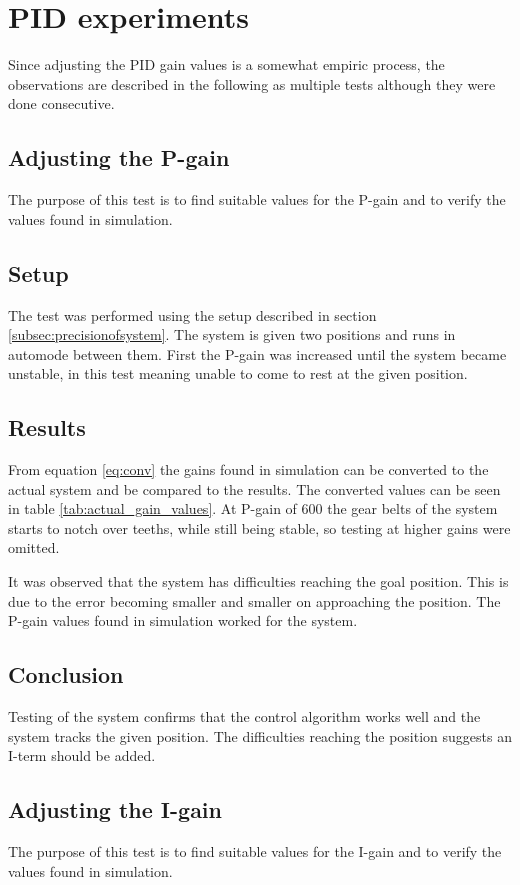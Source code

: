 \section{PID experiments}\label{sec:pid_experiments}
Since adjusting the PID gain values is a somewhat empiric process, the
observations are described in the following as multiple tests although they were
done consecutive.

\subsection{Adjusting the P-gain}\label{sec:pid_experiments_p}
The purpose of this test is to find suitable values for the P-gain and to verify
the values found in simulation.

\subsection*{Setup} The test was performed using the setup described in
section \ref{subsec:precisionofsystem}. The system is given two positions and runs in
automode between them. First the P-gain was increased until the system became
unstable, in this test meaning unable to come to rest at the given position.

\subsection*{Results} From equation \ref{eq:conv} the gains found in simulation can be
converted to the actual system and be compared to the results. The converted
values can be seen in table \ref{tab:actual_gain_values}. At P-gain of 600 the gear
belts of the system starts to notch over teeths, while still being stable, so
testing at higher gains were omitted.

It was observed that the system has difficulties reaching
the goal position. This is due to the error becoming smaller and smaller on
approaching the position. The P-gain values found in simulation worked for the
system.

\subsection*{Conclusion} Testing of the system confirms that the control
algorithm works well and the system tracks the given position. The difficulties
reaching the position suggests an I-term should be added.

\subsection{Adjusting the I-gain}\label{sec:pid_experiments_i}
The purpose of this test is to find suitable values for the I-gain and to verify
the values found in simulation.

